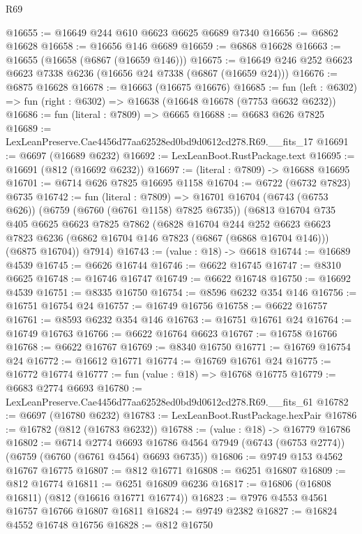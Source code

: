 \begin{lexlean}{R69}
\begin{coremodule}
{@16655 := @16649 @244 @610 @6623 @6625 @6689 @7340
@16656 := @6862 @16628
@16658 := @16656 @146 @6689
@16659 := @6868 @16628
@16663 := @16655 (@16658 (@6867 (@16659 @146)))
@16675 := @16649 @246 @252 @6623 @6623 @7338 @6236 (@16656 @24 @7338 (@6867 (@16659 @24)))
@16676 := @6875 @16628
@16678 := @16663 (@16675 @16676)
@16685 := fun (left : @6302) => fun (right : @6302) => @16638 (@16648 @16678 (@7753 @6632 @6232))
@16686 := fun (literal : @7809) => @6665
@16688 := @6683 @626 @7825
@16689 := LexLeanPreserve.Cae4456d77aa62528ed0bd9d0612cd278.R69.__fits_17
@16691 := @6697 (@16689 @6232)
@16692 := LexLeanBoot.RustPackage.text
@16695 := @16691 (@812 (@16692 @6232))
@16697 := (literal : @7809) -> @16688 @16695
@16701 := @6714 @626 @7825 @16695 @1158
@16704 := @6722 (@6732 @7823) @6735
@16742 := fun (literal : @7809) =>
  @16701
    @16704
    (@6743 (@6753 @626))
    (@6759 (@6760 (@6761 @1158) @7825 @6735))
    (@6813
      @16704
      @735
      @405
      @6625
      @6623
      @7825
      @7862
      (@6828
        @16704
        @244
        @252
        @6623
        @6623
        @7823
        @6236
        (@6862 @16704 @146 @7823 (@6867 (@6868 @16704 @146)))
        (@6875 @16704))
      @7914)
@16743 := (value : @18) -> @6618
@16744 := @16689 @4539
@16745 := @6626 @16744
@16746 := @6622 @16745
@16747 := @8310 @6625
@16748 := @16746 @16747
@16749 := @6622 @16748
@16750 := @16692 @4539
@16751 := @8335 @16750
@16754 := @8596 @6232 @354 @146
@16756 := @16751 @16754 @24
@16757 := @16749 @16756
@16758 := @6622 @16757
@16761 := @8593 @6232 @354 @146
@16763 := @16751 @16761 @24
@16764 := @16749 @16763
@16766 := @6622 @16764 @6623
@16767 := @16758 @16766
@16768 := @6622 @16767
@16769 := @8340 @16750
@16771 := @16769 @16754 @24
@16772 := @16612 @16771
@16774 := @16769 @16761 @24
@16775 := @16772 @16774
@16777 := fun (value : @18) => @16768 @16775
@16779 := @6683 @2774 @6693
@16780 := LexLeanPreserve.Cae4456d77aa62528ed0bd9d0612cd278.R69.__fits_61
@16782 := @6697 (@16780 @6232)
@16783 := LexLeanBoot.RustPackage.hexPair
@16786 := @16782 (@812 (@16783 @6232))
@16788 := (value : @18) -> @16779 @16786
@16802 := @6714
    @2774
    @6693
    @16786
    @4564
    @7949
    (@6743 (@6753 @2774))
    (@6759 (@6760 (@6761 @4564) @6693 @6735))
@16806 := @9749 @153 @4562 @16767 @16775
@16807 := @812 @16771
@16808 := @6251 @16807
@16809 := @812 @16774
@16811 := @6251 @16809 @6236
@16817 := @16806 (@16808 @16811) (@812 (@16616 @16771 @16774))
@16823 := @7976 @4553 @4561 @16757 @16766 @16807 @16811
@16824 := @9749 @2382
@16827 := @16824 @4552 @16748 @16756
@16828 := @812 @16750
}
\end{coremodule}
\end{lexlean}
